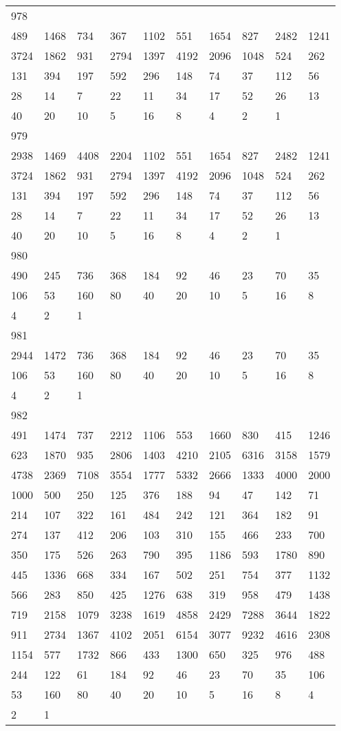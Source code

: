 \begin{longtable}{*{10}{l}}
978&&&&&&&&&\\
489& 1468& 734& 367& 1102& 551& 1654& 827& 2482& 1241\\
3724& 1862& 931& 2794& 1397& 4192& 2096& 1048& 524& 262\\
131& 394& 197& 592& 296& 148& 74& 37& 112& 56\\
28& 14& 7& 22& 11& 34& 17& 52& 26& 13\\
40& 20& 10& 5& 16& 8& 4& 2& 1& \\

979&&&&&&&&&\\
2938& 1469& 4408& 2204& 1102& 551& 1654& 827& 2482& 1241\\
3724& 1862& 931& 2794& 1397& 4192& 2096& 1048& 524& 262\\
131& 394& 197& 592& 296& 148& 74& 37& 112& 56\\
28& 14& 7& 22& 11& 34& 17& 52& 26& 13\\
40& 20& 10& 5& 16& 8& 4& 2& 1& \\

980&&&&&&&&&\\
490& 245& 736& 368& 184& 92& 46& 23& 70& 35\\
106& 53& 160& 80& 40& 20& 10& 5& 16& 8\\
4& 2& 1& \\

981&&&&&&&&&\\
2944& 1472& 736& 368& 184& 92& 46& 23& 70& 35\\
106& 53& 160& 80& 40& 20& 10& 5& 16& 8\\
4& 2& 1& \\

982&&&&&&&&&\\
491& 1474& 737& 2212& 1106& 553& 1660& 830& 415& 1246\\
623& 1870& 935& 2806& 1403& 4210& 2105& 6316& 3158& 1579\\
4738& 2369& 7108& 3554& 1777& 5332& 2666& 1333& 4000& 2000\\
1000& 500& 250& 125& 376& 188& 94& 47& 142& 71\\
214& 107& 322& 161& 484& 242& 121& 364& 182& 91\\
274& 137& 412& 206& 103& 310& 155& 466& 233& 700\\
350& 175& 526& 263& 790& 395& 1186& 593& 1780& 890\\
445& 1336& 668& 334& 167& 502& 251& 754& 377& 1132\\
566& 283& 850& 425& 1276& 638& 319& 958& 479& 1438\\
719& 2158& 1079& 3238& 1619& 4858& 2429& 7288& 3644& 1822\\
911& 2734& 1367& 4102& 2051& 6154& 3077& 9232& 4616& 2308\\
1154& 577& 1732& 866& 433& 1300& 650& 325& 976& 488\\
244& 122& 61& 184& 92& 46& 23& 70& 35& 106\\
53& 160& 80& 40& 20& 10& 5& 16& 8& 4\\
2& 1& \\


\end{longtable}
